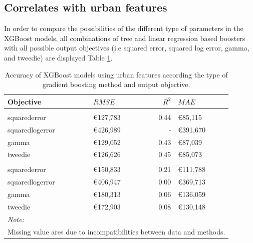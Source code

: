 \documentclass[conference,final,]{IEEEtran}
\begin{document}
\hypertarget{correlates-with-urban-features}{%
\subsection{Correlates with urban features}\label{correlates-with-urban-features}}

In order to compare the possibilities of the different type of parameters in the XGBoost models,
all combinations of tree and linear regression based boosters with all possible output objectives (i.e squared error, squared log error, gamma, and tweedie) are displayed Table \ref{tab:osm-model-comparison}.

\begin{table}[H]

\caption{\label{tab:osm-model-comparison}Accuracy of XGBoost models using urban features according the type of gradient boosting method and output objective.}
\centering
\fontsize{8}{10}\selectfont
\begin{tabular}[t]{llrl}
\toprule
Objective & $RMSE$ & $R^2$ & $MAE$\\
\midrule
\addlinespace[0.3em]
\multicolumn{4}{l}{\textbf{Tree based}}\\
\hspace{1em}squarederror & €127,783 & 0.44 & €85,115\\
\hspace{1em}squaredlogerror & €426,989 & - & €391,670\\
\hspace{1em}gamma & €129,052 & 0.43 & €87,039\\
\hspace{1em}tweedie & €126,626 & 0.45 & €85,073\\
\addlinespace[0.3em]
\multicolumn{4}{l}{\textbf{Linear regression based}}\\
\hspace{1em}squarederror & €150,833 & 0.21 & €111,788\\
\hspace{1em}squaredlogerror & €406,947 & 0.00 & €369,713\\
\hspace{1em}gamma & €180,313 & 0.06 & €136,059\\
\hspace{1em}tweedie & €172,903 & 0.08 & €130,148\\
\bottomrule
\multicolumn{4}{l}{\textit{Note: }}\\
\multicolumn{4}{l}{Missing value ares due to incompatibilities between data and methods.}\\
\end{tabular}
\end{table}
\end{document}
